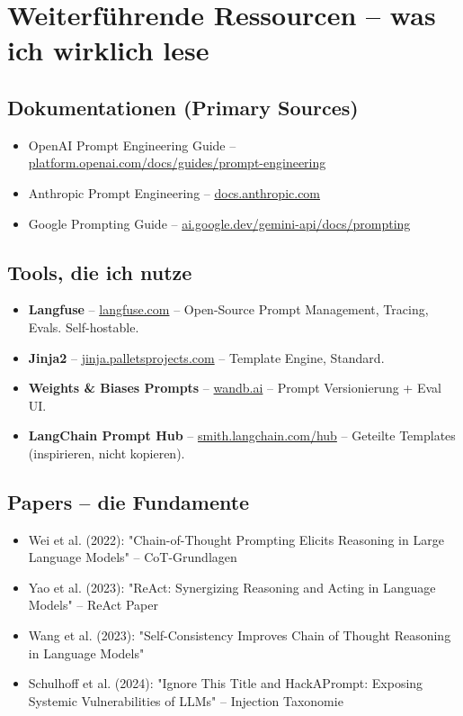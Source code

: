 \section{Weiterführende Ressourcen -- was ich wirklich lese}

\subsection{Dokumentationen (Primary Sources)}
\begin{itemize}[leftmargin=*]
    \item OpenAI Prompt Engineering Guide -- \href{https://platform.openai.com/docs/guides/prompt-engineering}{platform.openai.com/docs/guides/prompt-engineering}
    \item Anthropic Prompt Engineering -- \href{https://docs.anthropic.com/en/docs/build-with-claude/prompt-engineering}{docs.anthropic.com}
    \item Google Prompting Guide -- \href{https://ai.google.dev/gemini-api/docs/prompting}{ai.google.dev/gemini-api/docs/prompting}
\end{itemize}

\subsection{Tools, die ich nutze}
\begin{itemize}[leftmargin=*]
    \item \textbf{Langfuse} -- \href{https://langfuse.com}{langfuse.com} -- Open-Source Prompt Management, Tracing, Evals. Self-hostable.
    \item \textbf{Jinja2} -- \href{https://jinja.palletsprojects.com}{jinja.palletsprojects.com} -- Template Engine, Standard.
    \item \textbf{Weights \& Biases Prompts} -- \href{https://wandb.ai}{wandb.ai} -- Prompt Versionierung + Eval UI.
    \item \textbf{LangChain Prompt Hub} -- \href{https://smith.langchain.com/hub}{smith.langchain.com/hub} -- Geteilte Templates (inspirieren, nicht kopieren).
\end{itemize}

\subsection{Papers -- die Fundamente}
\begin{itemize}[leftmargin=*]
    \item Wei et al. (2022): "Chain-of-Thought Prompting Elicits Reasoning in Large Language Models" -- CoT-Grundlagen
    \item Yao et al. (2023): "ReAct: Synergizing Reasoning and Acting in Language Models" -- ReAct Paper
    \item Wang et al. (2023): "Self-Consistency Improves Chain of Thought Reasoning in Language Models"
    \item Schulhoff et al. (2024): "Ignore This Title and HackAPrompt: Exposing Systemic Vulnerabilities of LLMs" -- Injection Taxonomie
\end{itemize}

